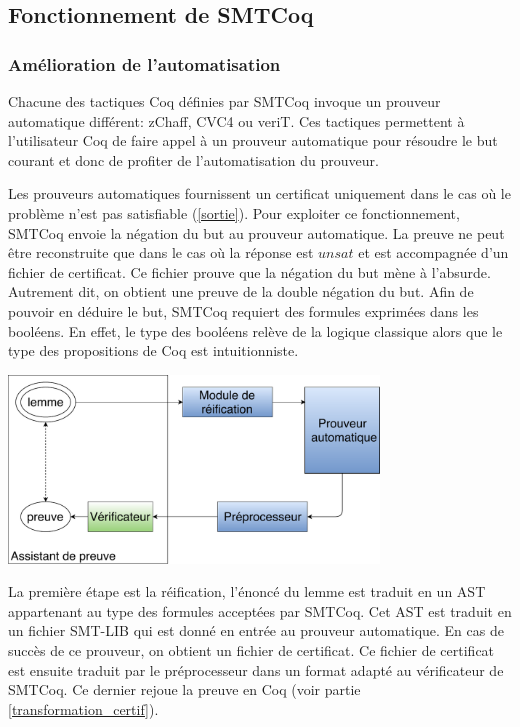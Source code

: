 \documentclass[11pt]{article}
\begin{document}
\subsection{Fonctionnement de SMTCoq}

\subsubsection{Amélioration de l'automatisation}\label{smtcoq_automatisation}

Chacune des tactiques Coq définies par SMTCoq invoque un prouveur automatique différent: zChaff, CVC4 ou veriT. Ces tactiques permettent à l'utilisateur Coq de faire appel à un prouveur automatique pour résoudre le but courant et donc de profiter de l'automatisation du prouveur. \medbreak



Les prouveurs automatiques fournissent un certificat uniquement dans le cas où le problème n'est pas satisfiable (\ref{sortie}). Pour exploiter ce fonctionnement, SMTCoq envoie la négation du but au prouveur automatique. La preuve ne peut être reconstruite que dans le cas où la réponse est $unsat$ et est accompagnée d'un fichier de certificat. Ce fichier prouve que la négation du but mène à l'absurde. Autrement dit, on obtient une preuve de la double négation du but. Afin de pouvoir en déduire le but, SMTCoq requiert des formules exprimées dans les booléens. En effet, le type des booléens relève de la logique classique alors que le type des propositions de Coq est intuitionniste. 

\begin{center}
    \includegraphics[height=5cm]{Automatisation.pdf}
\end{center}

La première étape est la réification, l'énoncé du lemme est traduit en un AST appartenant au type des formules acceptées par SMTCoq. Cet AST est traduit en un fichier SMT-LIB qui est donné en entrée au prouveur automatique. En cas de succès de ce prouveur, on obtient un fichier de certificat. Ce fichier de certificat est ensuite traduit par le préprocesseur dans un format adapté au vérificateur de SMTCoq. Ce dernier rejoue la preuve en Coq (voir partie \ref{transformation_certif}).
\end{document}
